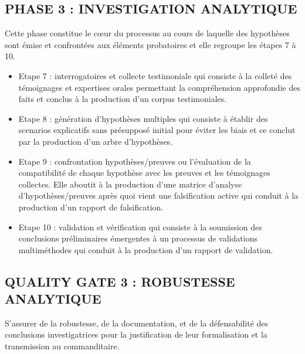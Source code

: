 \documentclass{article}
\begin{document}
\subsection*{PHASE 3 : INVESTIGATION ANALYTIQUE}
Cette phase constitue le cœur du processus au cours de laquelle des hypothèses sont émise et confrontées aux éléments probatoires et elle regroupe les étapes 7 à 10.
\begin{itemize}
	\item Etape 7 : interrogatoires et collecte testimoniale qui consiste à la colleté des témoignages et expertises orales permettant la compréhension approfondie des faits et conclus à la production d’un corpus testimoniales.
	\item Etape 8 : génération d’hypothèses multiples qui consiste à établir des scenarios explicatifs sans présupposé initial pour éviter les biais et ce conclut par la production d’un arbre d’hypothèses.
	\item Etape 9 : confrontation hypothèses/preuves ou l’évaluation de la compatibilité de chaque hypothèse avec les preuves et les témoignages collectes. Elle aboutit à la production d’une matrice d’analyse d’hypothèses/preuves après quoi vient une falsification active qui conduit à la production d’un rapport de falsification.
	\item Etape 10 : validation et vérification qui consiste à la soumission des conclusions préliminaires émergentes à un processus de validations multiméthodes qui conduit à la production d’un rapport de validation.
\end{itemize}
\subsection*{QUALITY GATE 3 : ROBUSTESSE ANALYTIQUE}
S’assurer de la robustesse, de la documentation, et de la défensabilité des conclusions investigatrices pour la justification de leur formalisation et la transmission au commanditaire.
\end{document}
